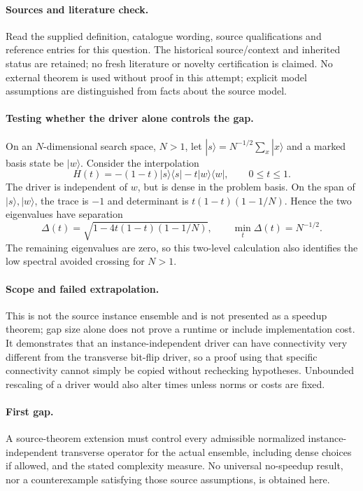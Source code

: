 \documentclass[11pt]{article}
\begin{document}
\paragraph{Sources and literature check.}
Read the supplied definition, catalogue wording, source qualifications and reference entries for this question. The historical source/context and inherited status are retained; no fresh literature or novelty certification is claimed. No external theorem is used without proof in this attempt; explicit model assumptions are distinguished from facts about the source model.

\paragraph{Testing whether the driver alone controls the gap.} On an \(N\)-dimensional search space, \(N>1\), let \(|s\rangle=N^{-1/2}\sum_x|x\rangle\) and a marked basis state be \(|w\rangle\). Consider the interpolation
\[
 H(t)=-(1-t)|s\rangle\langle s|-t|w\rangle\langle w|,\qquad0\le t\le1.
\]
The driver is independent of \(w\), but is dense in the problem basis. On the span of \(|s\rangle,|w\rangle\), the trace is \(-1\) and determinant is \(t(1-t)(1-1/N)\). Hence the two eigenvalues have separation
\[
 \Delta(t)=\sqrt{1-4t(1-t)(1-1/N)},\qquad \min_t\Delta(t)=N^{-1/2}.
\]
The remaining eigenvalues are zero, so this two-level calculation also identifies the low spectral avoided crossing for \(N>1\).
\paragraph{Scope and failed extrapolation.} This is not the source instance ensemble and is not presented as a speedup theorem; gap size alone does not prove a runtime or include implementation cost. It demonstrates that an instance-independent driver can have connectivity very different from the transverse bit-flip driver, so a proof using that specific connectivity cannot simply be copied without rechecking hypotheses. Unbounded rescaling of a driver would also alter times unless norms or costs are fixed.
\paragraph{First gap.} A source-theorem extension must control every admissible normalized instance-independent transverse operator for the actual ensemble, including dense choices if allowed, and the stated complexity measure. No universal no-speedup result, nor a counterexample satisfying those source assumptions, is obtained here.
\end{document}
